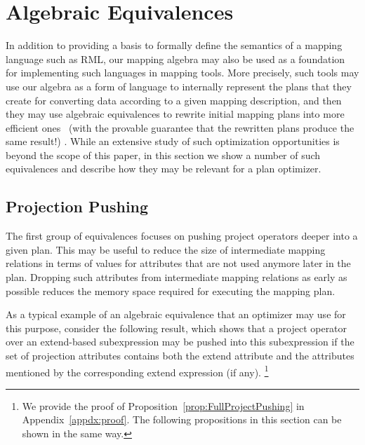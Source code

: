 \vspace{-3mm} %

\section{Algebraic Equivalences}%
\label{sec:equivalences}

\vspace{-2mm} %

In addition to providing a basis to formally define the semantics of a mapping language such as RML, our mapping algebra may also be used as a foundation for implementing such languages in mapping tools.
	More precisely,
such tools may use our algebra
	as a form of language
to internally represent the plans that they create for converting data according to a given mapping description, and then they may use algebraic equivalences to rewrite initial mapping plans into more efficient ones%
	~(with the provable guarantee that the rewritten plans produce the same result!)%
. While an extensive study of such optimization opportunities is beyond the scope of this paper, in this section we show a number of such equivalences and describe how they may be relevant for a plan optimizer.

\vspace{-3mm} %

\subsection{Projection Pushing} \label{ssec:equivalences:ProjectionPushing}

\vspace{-2mm} %

The first group of equivalences focuses on pushing
	project operators
deeper into a given plan. This may be useful to reduce the size of intermediate mapping relations in terms of
	values for attributes
that are not used anymore later in the plan.
	Dropping such attributes from intermediate mapping relations as early as possible reduces the memory space required for executing the mapping
		plan.

As a typical example of an algebraic equivalence that an optimizer may use for this purpose, consider the following result, which shows that a project operator over an extend-based subexpression may be pushed
into this subexpression if the set of projection attributes contains both the extend attribute and the attributes mentioned by the corresponding extend expression (if any).%
\footnote{We provide the proof of Proposition~\ref{prop:FullProjectPushing} in Appendix~\ref{appdx:proof}. The following propositions in this section can be shown in the same way.}

